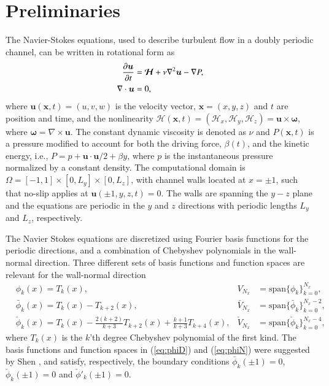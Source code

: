 \documentclass[preprint]{elsarticle}
\newcommand{\N}[1]{\check{#1}}
\newcommand{\D}[1]{\bar{#1}}
\begin{document}
\section{Preliminaries}
\label{sec:prelim}
The Navier-Stokes equations, used to describe turbulent flow in a doubly 
periodic channel, can be written in rotational form as
\begin{align}
 \frac{\partial \bm{u}}{\partial t}   &= \bm{\mathcal{H}} + \nu 
 \nabla^2 \bm{u} - \nabla{P}, \notag \\
 \nabla \cdot \bm{u} &= 0, \label{eq:NS}
\end{align}
where $\bm{u}(\bm{x}, t)=(u, v, w)$ is the velocity vector, $\bm{x}=(x, y, z)$ 
and $t$ are position and time, and the nonlinearity $\bm{\mathcal{H}}(\bm{x}, t) = (\mathcal{H}_x, \mathcal{H}_y, \mathcal{H}_z) = \bm{u}\times 
\bm{\omega}$, where $\bm{\omega} = \nabla \times \bm{u}$.  The constant dynamic viscosity is denoted as $\nu$ 
and $P(\bm{x}, t)$ is a pressure modified to account for both the driving force, $\beta(t)$, and the kinetic energy, i.e., $P = p + \bm{u} \cdot \bm{u}/2 + \beta y$, where $p$ is the instantaneous 
pressure normalized by a constant density. The computational domain is 
$\Omega=[-1, 1]\times [0, L_y] \times [0, L_z]$, with channel walls 
located at $x=\pm 1$, such that no-slip applies at 
$ \bm{u}(\pm 1, y, z, t) = 0$. The walls are spanning 
the $y-z$ plane and the equations are periodic in the $y$ and $z$ directions with periodic lengths $L_y$ and $L_z$, respectively.

The Navier Stokes equations are discretized using Fourier basis functions for the periodic directions, and a combination of Chebyshev polynomials in the wall-normal direction. Three different sets of basis functions and function spaces are relevant for the wall-normal direction
\begin{align}
&  \phi_k(x) = T_k(x), & V_{N_x} &= \text{span}\{\phi_k\}_{k=0}^{N_x}, \label{eq:Tk}\\
& \D{\phi}_k(x) = T_k(x) - T_{k+2}(x), & \D{V}_{N_x} &= \text{span} \{ \D{\phi}_k\}_{k=0}^{N_x-2}, \label{eq:phiD}\\
& \N{\phi}_k(x) = T_k(x) - \frac{2(k+2)}{k+3} T_{k+2}(x) + 
\frac{k+1}{k+3} T_{k+4}(x), & \N{V}_{N_x} &= \text{span} \{\N{\phi}_k\}_{k=0}^{N_x-4}, \label{eq:phiN} 
\end{align}
where $T_k(x)$ is the $k$'th degree Chebyshev polynomial of the first kind. The 
basis functions and function spaces in (\ref{eq:phiD}) and (\ref{eq:phiN}) were 
suggested by Shen \cite{Shen95}, and satisfy, respectively, the boundary conditions 
$\D{\phi}_k(\pm 1) = 0$, $\N{\phi}_k(\pm 1)=0$ and $\N{\phi}'_k(\pm 1)=0$. 
\end{document}
